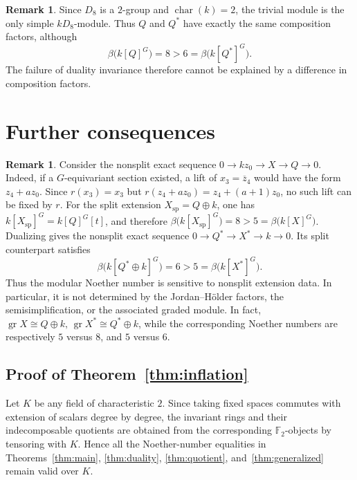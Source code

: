 \documentclass[11pt]{article}
\theoremstyle{definition}
\newtheorem{remark}[theorem]{Remark}
\begin{document}
	\begin{remark}
		Since $D_8$ is a $2$-group and $\operatorname{char}(k)=2$, the trivial module is the only simple $kD_8$-module. Thus $Q$ and $Q^*$ have exactly the same composition factors, although
		\[
		\beta\bigl(k[Q]^G\bigr)=8>6=\beta\bigl(k[Q^*]^G\bigr).
		\]
		The failure of duality invariance therefore cannot be explained by a difference in composition factors.
	\end{remark}

	\section{Further consequences}

	\begin{remark}
		Consider the nonsplit exact sequence $0\longrightarrow kz_0\longrightarrow X\longrightarrow Q\longrightarrow0$. Indeed, if a $G$-equivariant section existed, a lift of $x_3=\overline z_4$ would have the form $z_4+az_0$. Since $r(x_3)=x_3$ but $r(z_4+az_0)=z_4+(a+1)z_0$, no such lift can be fixed by $r$. For the split extension $X_{\mathrm{sp}}=Q\oplus k$, one has $k[X_{\mathrm{sp}}]^G=k[Q]^G[t]$, and therefore $\beta\bigl(k[X_{\mathrm{sp}}]^G\bigr)=8>5=\beta\bigl(k[X]^G\bigr)$.
		Dualizing gives the nonsplit exact sequence $0\longrightarrow Q^*\longrightarrow X^*\longrightarrow k\longrightarrow0$.
		Its split counterpart satisfies
		\[
		\beta\bigl(k[Q^*\oplus k]^G\bigr)=6>5=\beta\bigl(k[X^*]^G\bigr).
		\]
		Thus the modular Noether number is sensitive to nonsplit extension data. In particular, it is not determined by the Jordan--H\"older factors, the semisimplification, or the associated graded module. In fact, $\operatorname{gr}X\cong Q\oplus k, \, \operatorname{gr}X^*\cong Q^*\oplus k$, while the corresponding Noether numbers are respectively $5$ versus $8$, and $5$ versus $6$.
	\end{remark}

	\subsection*{Proof of Theorem~\ref{thm:inflation}}
	Let $K$ be any field of characteristic $2$. Since taking fixed spaces commutes with extension of scalars degree by degree, the invariant rings and their indecomposable quotients are obtained from the corresponding $\mathbb F_2$-objects by tensoring with $K$. Hence all the Noether-number equalities in Theorems~\ref{thm:main}, \ref{thm:duality}, \ref{thm:quotient}, and~\ref{thm:generalized} remain valid over $K$.
\end{document}
